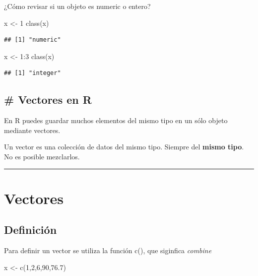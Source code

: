 \documentclass[
]{book}
\newenvironment{Shaded}{\begin{snugshade}}{\end{snugshade}}
\newcommand{\DecValTok}[1]{\textcolor[rgb]{0.00,0.00,0.81}{#1}}
\newcommand{\FloatTok}[1]{\textcolor[rgb]{0.00,0.00,0.81}{#1}}
\newcommand{\FunctionTok}[1]{\textcolor[rgb]{0.00,0.00,0.00}{#1}}
\newcommand{\NormalTok}[1]{#1}
\newcommand{\OtherTok}[1]{\textcolor[rgb]{0.56,0.35,0.01}{#1}}
\newcommand{\SpecialCharTok}[1]{\textcolor[rgb]{0.00,0.00,0.00}{#1}}
\begin{document}
¿Cómo revisar si un objeto es numeric o entero?

\begin{Shaded}
\begin{Highlighting}[]
\NormalTok{x }\OtherTok{\textless{}{-}} \DecValTok{1}
\FunctionTok{class}\NormalTok{(x)}
\end{Highlighting}
\end{Shaded}

\begin{verbatim}
## [1] "numeric"
\end{verbatim}

\begin{Shaded}
\begin{Highlighting}[]
\NormalTok{x }\OtherTok{\textless{}{-}} \DecValTok{1}\SpecialCharTok{:}\DecValTok{3}
\FunctionTok{class}\NormalTok{(x)}
\end{Highlighting}
\end{Shaded}

\begin{verbatim}
## [1] "integer"
\end{verbatim}

\hypertarget{vectors}{%
\section{\# Vectores en R}\label{vectors}}

En R puedes guardar muchos elementos del mismo tipo en un sólo objeto mediante vectores.

Un vector es una colección de datos del mismo tipo. Siempre del \textbf{mismo tipo}. No es posible mezclarlos.

\begin{center}\rule{0.5\linewidth}{0.5pt}\end{center}

\hypertarget{vectores}{%
\chapter{Vectores}\label{vectores}}

\hypertarget{definiciuxf3n}{%
\section{Definición}\label{definiciuxf3n}}

Para definir un vector se utiliza la función c(), que siginfica \emph{combine}

\begin{Shaded}
\begin{Highlighting}[]
\NormalTok{x }\OtherTok{\textless{}{-}} \FunctionTok{c}\NormalTok{(}\DecValTok{1}\NormalTok{,}\DecValTok{2}\NormalTok{,}\DecValTok{6}\NormalTok{,}\DecValTok{90}\NormalTok{,}\FloatTok{76.7}\NormalTok{)}
\end{Highlighting}
\end{Shaded}
\end{document}
